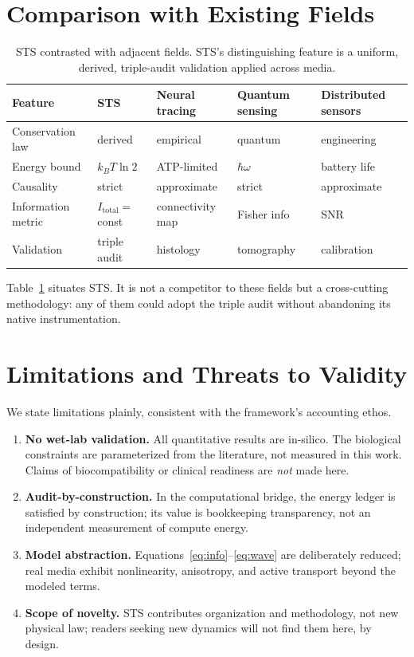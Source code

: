 \documentclass[11pt,a4paper]{article}
\begin{document}
\section{Comparison with Existing Fields}
\label{sec:comparison}

\begin{table}[t]
\centering
\small
\begin{tabular}{@{}lllll@{}}
\toprule
\textbf{Feature} & \textbf{STS} & \textbf{Neural tracing} & \textbf{Quantum sensing} & \textbf{Distributed sensors}\\
\midrule
Conservation law   & derived & empirical & quantum & engineering\\
Energy bound       & $k_B T\ln 2$ & ATP-limited & $\hbar\omega$ & battery life\\
Causality          & strict & approximate & strict & approximate\\
Information metric  & $I_\mathrm{total}=$const & connectivity map & Fisher info & SNR\\
Validation         & triple audit & histology & tomography & calibration\\
\bottomrule
\end{tabular}
\caption{STS contrasted with adjacent fields. STS's distinguishing feature is a
uniform, derived, triple-audit validation applied across media.}
\label{tab:compare}
\end{table}

Table~\ref{tab:compare} situates STS. It is not a competitor to these fields but a
cross-cutting methodology: any of them could adopt the triple audit without
abandoning its native instrumentation.

\section{Limitations and Threats to Validity}
\label{sec:limitations}

We state limitations plainly, consistent with the framework's accounting ethos.
\begin{enumerate}[leftmargin=1.6em]
  \item \textbf{No wet-lab validation.} All quantitative results are in-silico.
        The biological constraints are parameterized from the literature, not
        measured in this work. Claims of biocompatibility or clinical readiness
        are \emph{not} made here.
  \item \textbf{Audit-by-construction.} In the computational bridge, the energy
        ledger is satisfied by construction; its value is bookkeeping
        transparency, not an independent measurement of compute energy.
  \item \textbf{Model abstraction.} Equations~\eqref{eq:info}--\eqref{eq:wave} are
        deliberately reduced; real media exhibit nonlinearity, anisotropy, and
        active transport beyond the modeled terms.
  \item \textbf{Scope of novelty.} STS contributes organization and methodology,
        not new physical law; readers seeking new dynamics will not find them
        here, by design.
\end{enumerate}
\end{document}
